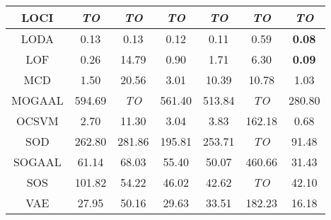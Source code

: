 \begin{table*}[!t]
\begin{tabular}{|c|c|c|c|c|c|c|}
\hline
                        LOCI &                  \textit{TO} &             \textit{TO} &                 \textit{TO} &                 \textit{TO} &               \textit{TO} &               \textit{TO} \\
\hline
                        LODA &                         0.13 &                    0.13 &                        0.12 &                        0.11 &                      0.59 &             \textbf{0.08} \\
\hline
                        LOF &                         0.26 &                   14.79 &                        0.90 &                        1.71 &                      6.30 &             \textbf{0.09} \\
\hline
                        MCD &                         1.50 &                   20.56 &                        3.01 &                       10.39 &                     10.78 &                      1.03 \\
\hline
                        MOGAAL &                       594.69 &             \textit{TO} &                      561.40 &                      513.84 &               \textit{TO} &                    280.80 \\
\hline
                        OCSVM &                         2.70 &                   11.30 &                        3.04 &                        3.83 &                    162.18 &                      0.68 \\
\hline
                        SOD &                       262.80 &                  281.86 &                      195.81 &                      253.71 &               \textit{TO} &                     91.48 \\
\hline
                        SOGAAL &                        61.14 &                   68.03 &                       55.40 &                       50.07 &                    460.66 &                     31.43 \\
\hline
                        SOS &                       101.82 &                   54.22 &                       46.02 &                       42.62 &               \textit{TO} &                     42.10 \\
\hline
                        VAE &                        27.95 &                   50.16 &                       29.63 &                       33.51 &                    182.23 &                     16.18 \\
\hline
\end{tabular}
\end{table*}

